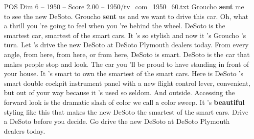 \begin{textsample}{POS Dim 6 – 1950 – Score 2.00 – 1950/tv\_com\_1950\_60.txt}  \label{ex:f6_pos_009}
Groucho \textbf{sent} me to see the new DeSoto.
Groucho \textbf{sent} us and we want to drive this car.
Oh, what a thrill you 're going to feel when you 're behind the wheel.
DeSoto is the smartest car, smartest of the smart cars.
It 's so stylish and now it 's Groucho 's turn.
Let 's drive the new DeSoto at DeSoto Plymouth dealers today.
From every angle, from here, from here, or from here, DeSoto is smart.
DeSoto is the car that makes people stop and look.
The car you 'll be proud to have standing in front of your house.
It 's smart to own the smartest of the smart cars.
Here is DeSoto 's smart double cockpit instrument panel with a new flight control lever, convenient, but out of your way because it 's used so seldom.
And outside.
Accessing the forward look is the dramatic slash of color we call a color sweep.
It 's \textbf{beautiful} styling like this that makes the new DeSoto the smartest of the smart cars.
Drive a DeSoto before you decide.
Go drive the new DeSoto at DeSoto Plymouth dealers today.

\end{textsample}
